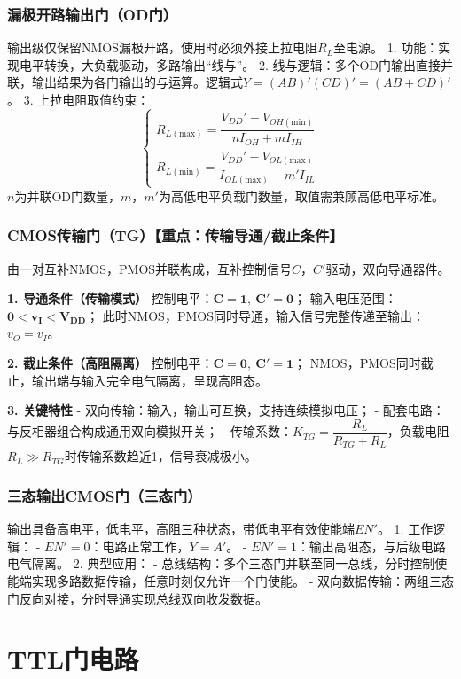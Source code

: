 \subsubsection{漏极开路输出门（OD门）}
输出级仅保留NMOS漏极开路，使用时必须外接上拉电阻\(R_L\)至电源。
1. 功能：实现电平转换，大负载驱动，多路输出“线与”。
2. 线与逻辑：多个OD门输出直接并联，输出结果为各门输出的与运算。逻辑式\(Y=(AB)'(CD)'=(AB+CD)'\)。
3. 上拉电阻取值约束：
\[
\begin{cases}
R_{L(\text{max})}=\dfrac{V_{DD}'-V_{OH(\text{min})}}{nI_{OH}+mI_{IH}}\\[6pt]
R_{L(\text{min})}=\dfrac{V_{DD}'-V_{OL(\text{max})}}{I_{OL(\text{max})}-m'I_{IL}}
\end{cases}
\]
\(n\)为并联OD门数量，\(m\)，\(m'\)为高低电平负载门数量，取值需兼顾高低电平标准。

\subsubsection{CMOS传输门（TG）【重点：传输导通/截止条件】}
由一对互补NMOS，PMOS并联构成，互补控制信号\(C\)，\(C'\)驱动，双向导通器件。

\textbf{1. 导通条件（传输模式）}
控制电平：\(\boldsymbol{C=1,\ C'=0}\)；
输入电压范围：\(\boldsymbol{0 < v_I < V_{DD}}\)；
此时NMOS，PMOS同时导通，输入信号完整传递至输出：\(v_O=v_I\)。

\textbf{2. 截止条件（高阻隔离）}
控制电平：\(\boldsymbol{C=0,\ C'=1}\)；
NMOS，PMOS同时截止，输出端与输入完全电气隔离，呈现高阻态。

\textbf{3. 关键特性}
- 双向传输：输入，输出可互换，支持连续模拟电压；
- 配套电路：与反相器组合构成通用双向模拟开关；
- 传输系数：\(K_{TG}=\dfrac{R_L}{R_{TG}+R_L}\)，负载电阻\(R_L \gg R_{TG}\)时传输系数趋近1，信号衰减极小。

\subsubsection{三态输出CMOS门（三态门）}
输出具备高电平，低电平，高阻三种状态，带低电平有效使能端\(EN'\)。
1. 工作逻辑：
    - \(EN'=0\)：电路正常工作，\(Y=A'\)。
    - \(EN'=1\)：输出高阻态，与后级电路电气隔离。
2. 典型应用：
    - 总线结构：多个三态门并联至同一总线，分时控制使能端实现多路数据传输，任意时刻仅允许一个门使能。
    - 双向数据传输：两组三态门反向对接，分时导通实现总线双向收发数据。

\section{TTL门电路}

